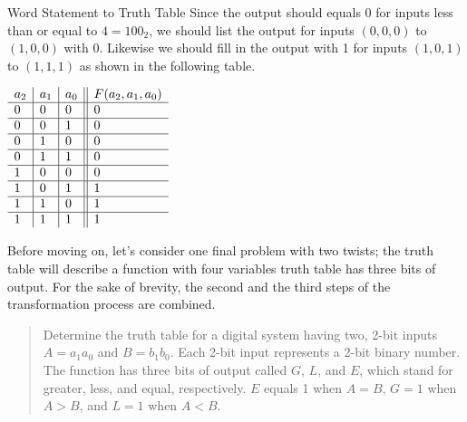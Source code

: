 \begin{process}{Word Statement to Truth Table}
Since the output should equals 0 for inputs less than or equal to $4 = 100_2$,
we should  list the output for inputs $(0,0,0)$ to $(1,0,0)$ with 0.  Likewise we
should fill in the output with 1 for inputs $(1,0,1)$ to $(1,1,1)$ as shown in
the following table.

$
\begin{array}[ht]{l|l|l||l}
a_2 & a_1 & a_0 & F(a_2, a_1, a_0)        \\ \hline
0   & 0   & 0   &    0    \\ \hline
0   & 0   & 1   &    0    \\ \hline
0   & 1   & 0   &    0    \\ \hline
0   & 1   & 1   &    0    \\ \hline
1   & 0   & 0   &    0    \\ \hline
1   & 0   & 1   &    1    \\ \hline
1   & 1   & 0   &    1    \\ \hline
1   & 1   & 1   &    1    \\
\end{array}$

\end{process}

Before moving on, let's consider one final problem with two
twists; the truth table will describe a function with four variables
truth table has three bits of output.  For the sake of brevity, the second and the
third steps of the transformation process are combined.

\begin{quote}
Determine the truth table for a digital system having two, 2-bit
inputs $A=a_1 a_0$ and $B=b_1 b_0$. Each 2-bit input represents a
2-bit binary number.  The function has three bits of output called
$G$, $L$, and $E$, which stand for greater, less, and equal, respectively.
$E$ equals 1 when $A=B$, $G=1$ when $A>B$, and $L=1$ when $A<B$.
\end{quote}

